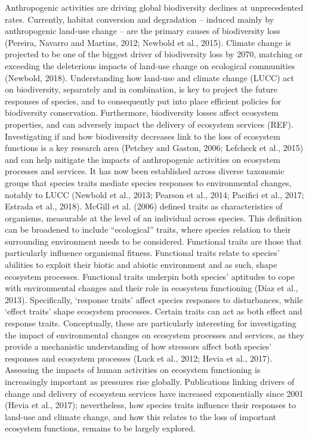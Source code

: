 Anthropogenic activities are driving global biodiversity declines at unprecedented rates. Currently, habitat conversion and degradation – induced mainly by anthropogenic land-use change –  are the primary causes of biodiversity loss (Pereira, Navarro and Martins, 2012; Newbold et al., 2015). Climate change is projected to be one of the biggest driver of biodiversity loss by 2070, matching or exceeding the deleterious impacts of land-use change on ecological communities (Newbold, 2018). Understanding how land-use and climate change (LUCC) act on biodiversity, separately and in combination, is key to project the future responses of species, and to consequently put into place efficient policies for biodiversity conservation. Furthermore, biodiversity losses affect ecosystem properties, and can adversely impact the delivery of ecosystem services (REF). Investigating if and how biodiversity decreases link to the loss of ecosystem functions is a key research area (Petchey and Gaston, 2006; Lefcheck et al., 2015) and can help mitigate the impacts of anthropogenic activities on ecosystem processes and services.
It has now been established across diverse taxonomic groups that species traits mediate species responses to environmental changes, notably to LUCC (Newbold et al., 2013; Pearson et al., 2014; Pacifici et al., 2017; Estrada et al., 2018). McGill et al. (2006) defined traits as characteristics of organisms, measurable at the level of an individual across species. This definition can be broadened to include “ecological” traits, where species relation to their surrounding environment needs to be considered. Functional traits are those that particularly influence organismal fitness. Functional traits relate to species’ abilities to exploit their biotic and abiotic environment and as such, shape ecosystem processes. Functional traits underpin both species’ aptitudes to cope with environmental changes and their role in ecosystem functioning (Díaz et al., 2013). Specifically, ‘response traits’ affect species responses to disturbances, while ‘effect traits’ shape ecosystem processes. Certain traits can act as both effect and response traits. Conceptually, these are particularly interesting for investigating the impact of environmental changes on ecosystem processes and services, as they provide a mechanistic understanding of how stressors affect both species’ responses and ecosystem processes (Luck et al., 2012; Hevia et al., 2017).  Assessing the impacts of human activities on ecosystem functioning is increasingly important as pressures rise globally. Publications linking drivers of change and delivery of ecosystem services have increased exponentially since 2001 (Hevia et al., 2017); nevertheless, how species traits influence their responses to land-use and climate change, and how this relates to the loss of important ecosystem functions, remains to be largely explored.
